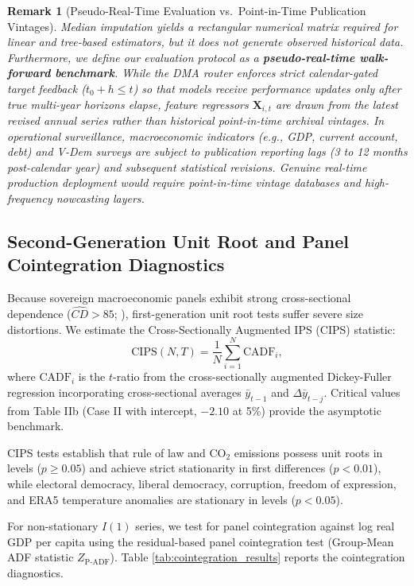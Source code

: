 \documentclass[11pt,a4paper]{article}
\newtheorem{remark}{Remark}
\begin{document}
\begin{remark}[Pseudo-Real-Time Evaluation vs.\ Point-in-Time Publication Vintages]
Median imputation yields a rectangular numerical matrix required for linear and tree-based estimators, but it does not generate observed historical data. Furthermore, we define our evaluation protocol as a \textbf{pseudo-real-time walk-forward benchmark}. While the DMA router enforces strict calendar-gated target feedback ($t_0 + h \le t$) so that models receive performance updates only after true multi-year horizons elapse, feature regressors $\mathbf{X}_{i,t}$ are drawn from the latest revised annual series rather than historical point-in-time archival vintages. In operational surveillance, macroeconomic indicators (e.g., GDP, current account, debt) and V-Dem surveys are subject to publication reporting lags (3 to 12 months post-calendar year) and subsequent statistical revisions. Genuine real-time production deployment would require point-in-time vintage databases and high-frequency nowcasting layers.
\end{remark}

\subsection{Second-Generation Unit Root and Panel Cointegration Diagnostics}

Because sovereign macroeconomic panels exhibit strong cross-sectional dependence ($\hat{CD} > 85$; \citealt{pesaran2021cd}), first-generation unit root tests suffer severe size distortions. We estimate the \citet{pesaran2007} Cross-Sectionally Augmented IPS (CIPS) statistic:
\begin{equation}
\text{CIPS}(N, T) = \frac{1}{N} \sum_{i=1}^N \text{CADF}_i,
\end{equation}
where $\text{CADF}_i$ is the $t$-ratio from the cross-sectionally augmented Dickey-Fuller regression incorporating cross-sectional averages $\bar{y}_{t-1}$ and $\Delta \bar{y}_{t-j}$. Critical values from \citet{pesaran2007} Table IIb (Case II with intercept, $-2.10$ at 5\%) provide the asymptotic benchmark.

CIPS tests establish that rule of law and CO$_2$ emissions possess unit roots in levels ($p \ge 0.05$) and achieve strict stationarity in first differences ($p < 0.01$), while electoral democracy, liberal democracy, corruption, freedom of expression, and ERA5 temperature anomalies are stationary in levels ($p < 0.05$).

For non-stationary $I(1)$ series, we test for panel cointegration against log real GDP per capita using the \citet{pedroni1999, pedroni2004} residual-based panel cointegration test (Group-Mean ADF statistic $Z_{\text{P-ADF}}$). Table \ref{tab:cointegration_results} reports the cointegration diagnostics.
\end{document}
